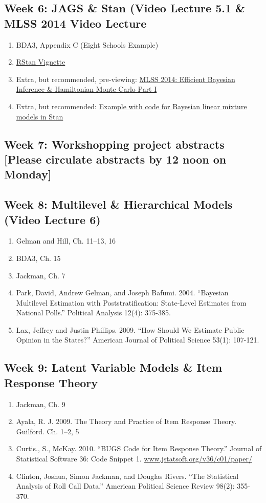 \documentclass[11pt, leqno, fleqn]{article}
\begin{document}
\subsection*{Week 6: JAGS \& Stan (Video Lecture 5.1 \& MLSS 2014 Video Lecture}
	\begin{enumerate}
	\item[] BDA3, Appendix C (Eight Schools Example)
	\item[] \href{https://github.com/stan-dev/rstan/releases/download/v2.6.0/rstan_vignette.pdf}{RStan Vignette}
	\item[] Extra, but recommended, pre-viewing: \href{http://youtu.be/pHsuIaPbNbY}{MLSS 2014: Efficient Bayesian Inference \& Hamiltonian Monte Carlo Part I}
	\item[] Extra, but recommended: \href{http://www.ling.uni-potsdam.de/~vasishth/statistics/BayesLMMs.html}{Example with code for Bayesian linear mixture models in Stan}
	\end{enumerate}
\subsection*{Week 7: Workshopping project abstracts [Please circulate abstracts by 12 noon on Monday]}
\subsection*{Week 8: Multilevel \& Hierarchical Models (Video Lecture 6)}
	\begin{enumerate}
	\item[] Gelman and Hill, Ch. 11--13, 16
	\item[] BDA3, Ch. 15
	\item[] Jackman, Ch. 7
	\item[] Park, David, Andrew Gelman, and Joseph Bafumi. 2004. ``Bayesian Multilevel Estimation with Poststratification: State-Level Estimates from National Polls.'' Political Analysis 12(4): 375-385.
	\item[] Lax, Jeffrey and Justin Phillips. 2009. ``How Should We Estimate Public Opinion in the States?'' American Journal of Political Science 53(1): 107-121.
	\end{enumerate}
\subsection*{Week 9: Latent Variable Models \& Item Response Theory}
	\begin{enumerate}
	\item[] Jackman, Ch. 9
	\item[] Ayala, R. J. 2009. The Theory and Practice of Item Response Theory. Guilford. Ch. 1--2, 5
	\item[] Curtis., S., McKay. 2010. ``BUGS Code for Item Response Theory.'' Journal of
Statistical Software 36: Code Snippet 1. \url{
www.jstatsoft.org/v36/c01/paper/}
	\item[] Clinton, Joshua, Simon Jackman, and Douglas Rivers. ``The Statistical Analysis
of Roll Call Data.'' American Political Science Review 98(2): 355-370.
	\end{enumerate}
\end{document}
